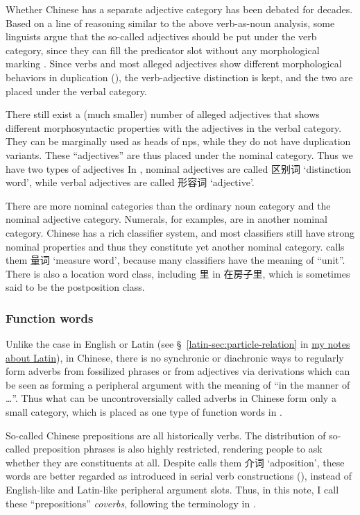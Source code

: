 \documentclass[UTF8, a4paper, oneside, scheme=plain]{ctexart}
\newcommand*{\citesec}[1]{\S~{#1}}
\newcommand*{\term}[1]{\emph{#1}}
\newcommand{\latin}{\href{../Latin/latin-notes.pdf}{my notes about Latin}}
\newcommand{\translate}[1]{`#1'}
\begin{document}
Whether Chinese has a separate adjective category 
has been debated for decades.
Based on a line of reasoning similar to the above verb-as-noun analysis,
some linguists argue that the so-called adjectives should be put under the verb category,
since they can fill the predicator slot without any morphological marking \citep{li1989mandarin}.
Since verbs and most alleged adjectives show different morphological behaviors in duplication 
(),
the verb-adjective distinction is kept,
and the two are placed under the verbal category.

There still exist a (much smaller) number of alleged adjectives that shows 
different morphosyntactic properties with the adjectives in the verbal category.
They can be marginally used as heads of \ac{np}s,
while they do not have duplication variants.
These ``adjectives'' are thus placed under the nominal category.
Thus we have two types of adjectives
In \citet{zhudexigrammar}, 
nominal adjectives are called 区别词 \translate{distinction word},
while verbal adjectives are called 形容词 \translate{adjective}.

There are more nominal categories than the ordinary noun category and the nominal adjective category.
Numerals, for examples, are in another nominal category.
Chinese has a rich classifier system,
and most classifiers still have strong nominal properties
and thus they constitute yet another nominal category.
\citet{zhudexigrammar} calls them 量词 \translate{measure word},
because many classifiers have the meaning of ``unit''.
There is also a location word class, including 里 in 在房子里,
which is sometimes said to be the postposition class.

\subsubsection{Function words}

Unlike the case in English or Latin 
(see \citesec{\ref{latin-sec:particle-relation}} in \latin), 
in Chinese, there is no synchronic or diachronic ways 
to regularly form adverbs from fossilized phrases 
or from adjectives via derivations 
which can be seen as forming a peripheral argument 
with the meaning of ``in the manner of \dots''.
Thus what can be uncontroversially called adverbs in Chinese 
form only a small category,
which is placed as one type of function words in \citet{zhudexigrammar}.

So-called Chinese prepositions are all historically verbs.
The distribution of so-called preposition phrases %
is also highly restricted,
rendering people to ask whether they are constituents at all.
Despite \citet{zhudexigrammar} calls them 介词 \translate{adposition},
these words are better regarded as introduced in serial verb constructions
(),
instead of English-like and Latin-like peripheral argument slots.
Thus, in this note, I call these ``prepositions'' \term{coverbs},
following the terminology in \citet{po2015chinese}.
\end{document}
